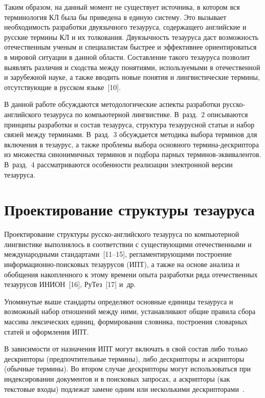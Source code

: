 \begin{multicols}{2}
  Таким образом, на данный момент не существует источника, в котором вся терминология 
КЛ была бы приведена в единую систему. Это вызывает необходимость разработки 
двуязычного тезауруса, содержащего английские и русские термины КЛ и их толкования. 
Двуязычность тезауруса даст возможность отечественным ученым и специалистам быстрее и 
эффективнее ориентироваться в мировой ситуации в данной области. Составление такого 
тезауруса позволит выявлять различия и сходства между понятиями, используемыми в 
отечественной и зарубежной науке, а также вводить новые понятия и лингвистические 
термины, отсутствующие в русском языке~[10].
  
  В данной работе обсуждаются методологические аспекты разработки русско-английского 
тезауруса по компьютерной лингвистике. В~разд.~2 описываются принципы разработки и 
состав тезауруса, структура тезаурусной статьи и набор связей между терминами. В~разд.~3 
обсуждается методика выбора терминов для включения в тезаурус, а также проблемы выбора 
основного тер\-ми\-на-де\-скрип\-то\-ра из множества синонимичных терминов и подбора парных 
тер\-ми\-нов-экви\-ва\-лен\-тов. В~разд.~4 рас\-смат\-ри\-ва\-ют\-ся особенности реализации электронной 
версии тезауруса.

\section{Проектирование структуры тезауруса }

  Проектирование структуры русско-английского тезауруса по компьютерной лингвистике 
выполнялось в соответствии с существующими отечественными и международными 
стандартами~[11--15], регламентирующими построение информационно-поисковых 
тезаурусов (ИПТ), а также на основе анализа и обобщения накопленного к этому времени 
опыта разработки ряда отечественных тезаурусов ИНИОН~[16], РуТез~[17] и~др. 
  
  Упомянутые выше стандарты определяют основные единицы тезауруса и возможный 
набор отношений между ними, устанавливают общие правила сбора массива лексических 
единиц, формирования словника, построения словарных статей и оформления ИПТ.
  
  В зависимости от назначения ИПТ могут включать в свой состав либо только 
дескрипторы (предпочтительные термины), либо дескрипторы и аскрипторы (обычные 
термины). Во втором случае дескрипторы могут использоваться при индексировании 
документов и в поисковых запросах, а аскрипторы (как текстовые входы) подлежат замене 
одним или несколькими дескрипторами~\cite{17-zag}.
  

\end{multicols}
